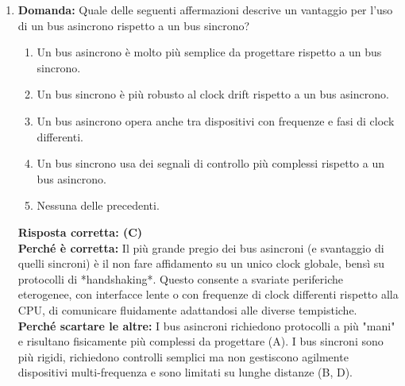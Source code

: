 \documentclass[12pt, a4paper]{article}
\begin{document}
\begin{enumerate}
    \item \textbf{Domanda:} Quale delle seguenti affermazioni descrive un vantaggio per l'uso di un bus asincrono rispetto a un bus sincrono?
    \begin{enumerate}[label=(\Alph*)]
        \item Un bus asincrono è molto più semplice da progettare rispetto a un bus sincrono.
        \item Un bus sincrono è più robusto al clock drift rispetto a un bus asincrono.
        \item Un bus asincrono opera anche tra dispositivi con frequenze e fasi di clock differenti.
        \item Un bus sincrono usa dei segnali di controllo più complessi rispetto a un bus asincrono.
        \item Nessuna delle precedenti.
    \end{enumerate}
    \textbf{Risposta corretta: (C)} \\
    \textbf{Perché è corretta:} Il più grande pregio dei bus asincroni (e svantaggio di quelli sincroni) è il non fare affidamento su un unico clock globale, bensì su protocolli di *handshaking*. Questo consente a svariate periferiche eterogenee, con interfacce lente o con frequenze di clock differenti rispetto alla CPU, di comunicare fluidamente adattandosi alle diverse tempistiche. \\
    \textbf{Perché scartare le altre:} I bus asincroni richiedono protocolli a più "mani" e risultano fisicamente più complessi da progettare (A). I bus sincroni sono più rigidi, richiedono controlli semplici ma non gestiscono agilmente dispositivi multi-frequenza e sono limitati su lunghe distanze (B, D).


\end{enumerate}
\end{document}
